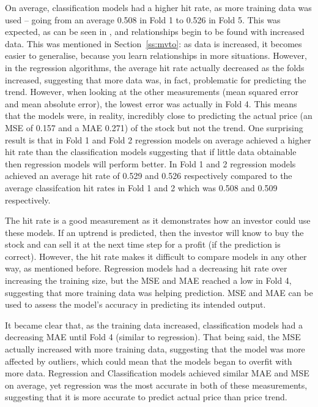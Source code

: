 \documentclass[11pt,a4paper]{article}
\numberwithin{equation}{section}
\begin{document}
On average, classification models had a higher hit rate, as more training data was used – going from an average 0.508 in Fold 1 to 0.526 in Fold 5. This was expected, as can be seen in \cite{Halevy2009}, and relationships begin to be found with increased data. This was mentioned in Section~\ref{ss:mvto}: as data is increased, it becomes easier to generalise, because you learn relationships in more situations. However, in the regression algorithms, the average hit rate actually decreased as the folds increased, suggesting that more data was, in fact, problematic for predicting the trend. However, when looking at the other measurements (mean squared error and mean absolute error), the lowest error was actually in Fold 4. This means that the models were, in reality, incredibly close to predicting the actual price (an MSE of 0.157 and a MAE 0.271) of the stock but not the trend.  One surprising result is that in Fold 1 and Fold 2 regression models on average achieved a higher hit rate than the classification models suggesting that if little data obtainable then regression models will perform better. In Fold 1 and 2 regression models achieved an average hit rate of 0.529 and 0.526 respectively compared to the average classifcation hit rates in Fold 1 and 2 which was 0.508 and 0.509 respectively.

The hit rate is a good measurement as it demonstrates how an investor could use these models. If an uptrend is predicted, then the investor will know to buy the stock and can sell it at the next time step for a profit (if the prediction is correct). However, the hit rate makes it difficult to compare models in any other way, as mentioned before. Regression models had a decreasing hit rate over increasing the training size, but the MSE and MAE reached a low in Fold 4, suggesting that more training data was helping prediction. MSE and MAE can be used to assess the model’s accuracy in predicting its intended output.

It became clear that, as the training data increased, classification models had a decreasing MAE until Fold 4 (similar to regression). That being said, the MSE actually increased with more training data, suggesting that the model was more affected by outliers, which could mean that the models began to overfit with more data. Regression and Classification models achieved similar MAE and MSE on average, yet regression was the most accurate in both of these measurements, suggesting that it is more accurate to predict actual price than price trend.
\end{document}
